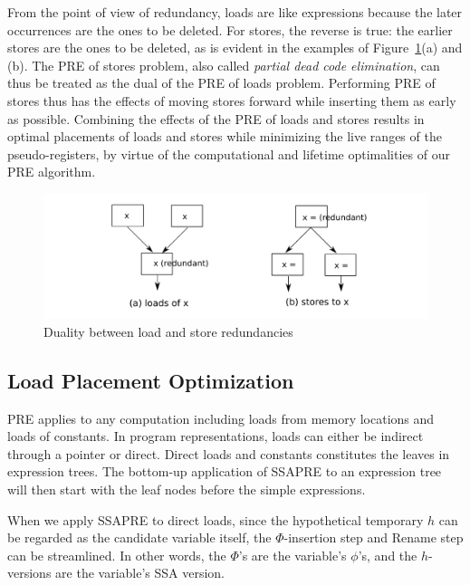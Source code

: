 From the point of view of redundancy, loads are like expressions because the
later occurrences are the ones to be deleted.  For stores, the reverse is true:
the earlier stores are the ones to be deleted, as is evident in the examples
of Figure~\ref{fig: load-store-dual}(a) and (b).  The PRE of stores problem,
also called \emph{partial dead code elimination}, can thus be treated as the
dual of the PRE of loads problem.  Performing PRE of stores thus has the effects
of moving stores forward while inserting them as early as possible.  
Combining the effects of the PRE of loads and stores results in optimal
placements of loads and stores while minimizing the live ranges of the
pseudo-registers, by virtue of the computational and lifetime optimalities
of our PRE algorithm.

\begin{figure}
\centering
\includegraphics[scale=0.55]{fig-load-store-dual.pdf}
\caption{Duality between load and store redundancies}
\label{fig: load-store-dual}
\end{figure}

\subsection{Load Placement Optimization}

PRE applies to any computation including loads from memory locations and
loads of constants.  In program representations, loads can either be indirect 
through a pointer or direct.  Direct loads  and constants constitutes the leaves
in expression trees.  The bottom-up application of SSAPRE to an expression
tree will then start with the leaf nodes before the simple expressions.

When we apply SSAPRE to direct loads, since the hypothetical temporary $h$ can
be regarded as the candidate variable itself, the $\Phi$-insertion step and
Rename step can be streamlined.  In other words, the $\Phi$'s are the variable's
$\phi$'s, and the $h$-versions are the variable's SSA version.

